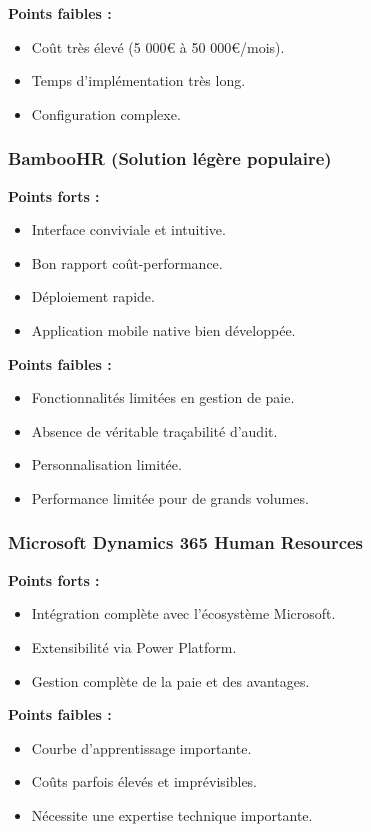 \textbf{Points faibles :}
\begin{itemize}
    \item Coût très élevé (5 000€ à 50 000€/mois).
    \item Temps d'implémentation très long.
    \item Configuration complexe.
\end{itemize}

\subsubsection*{BambooHR (Solution légère populaire)}

\textbf{Points forts :}
\begin{itemize}
    \item Interface conviviale et intuitive.
    \item Bon rapport coût-performance.
    \item Déploiement rapide.
    \item Application mobile native bien développée.
\end{itemize}

\textbf{Points faibles :}
\begin{itemize}
    \item Fonctionnalités limitées en gestion de paie.
    \item Absence de véritable traçabilité d'audit.
    \item Personnalisation limitée.
    \item Performance limitée pour de grands volumes.
\end{itemize}

\subsubsection*{Microsoft Dynamics 365 Human Resources}

\textbf{Points forts :}
\begin{itemize}
    \item Intégration complète avec l'écosystème Microsoft.
    \item Extensibilité via Power Platform.
    \item Gestion complète de la paie et des avantages.
\end{itemize}

\textbf{Points faibles :}
\begin{itemize}
    \item Courbe d'apprentissage importante.
    \item Coûts parfois élevés et imprévisibles.
    \item Nécessite une expertise technique importante.
\end{itemize}

